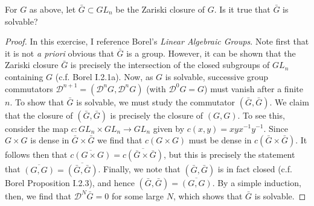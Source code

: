 \documentclass{../../mathnotes}
\begin{document}
\begin{exc}
    For $G$ as above, let $\bar G\subset GL_n$ be the Zariski closure of $G$. Is
    it true that $\bar G$ is solvable?
\end{exc}
\begin{proof}
    In this exercise, I reference Borel's \textit{Linear Algebraic Groups}. Note first
    that it is not \textit{a priori}
    obvious that $\bar G$ is a group. However, it can be shown that the Zariski closure
    $\bar G$ is precisely the intersection of the closed subgroups of $GL_n$ containing
    $G$ (c.f. Borel I.2.1a). Now, as $G$ is solvable, successive group commutators
    $\mathcal{D}^{n+1}=(\mathcal{D}^nG,\mathcal{D}^nG)$ (with $\mathcal{D}^0G=G$) must
    vanish after a finite $n$. To show that $\bar G$ is solvable, we must study the
    commutator $(\bar G,\bar G)$. We claim that the closure of $(\bar G,\bar G)$ is
    precisely the closure of $(G,G)$. To see this, consider the map $c:GL_n\times GL_n\to GL_n$
    given by $c(x,y)=xyx^{-1}y^{-1}$. Since $G\times G$ is dense in $\bar G\times\bar G$
    we find that $c(G\times G)$ must be dense in $c(\bar G\times \bar G)$. It follows
    then that $\overline{c(G\times G)}=\overline{c(\bar G\times\bar G)}$, but this is
    precisely the statement that $\overline{(G,G)}=\overline{(\bar G,\bar G)}$. Finally,
    we note that $(\bar G,\bar G)$ is in fact closed (c.f. Borel Proposition I.2.3),
    and hence $(\bar G,\bar G)=\overline{(G,G)}$. By a simple induction, then, we find
    that $\mathcal{D}^N\bar G=0$ for some large $N$, which shows that $\bar G$ is solvable.
\end{proof}
\end{document}
